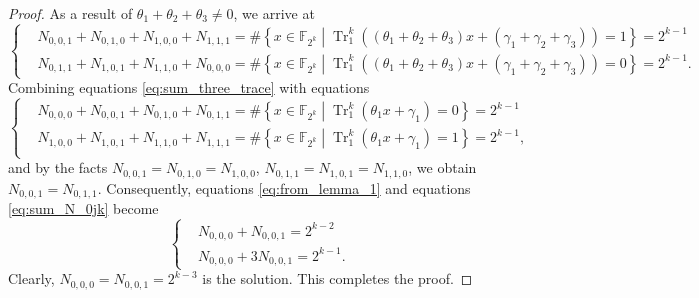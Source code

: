 \documentclass{article}
\newcommand{\F}{\mathbb{F}}
\newcommand{\0}{\textbf{0}}
\newcommand{\1}{\textbf{1}}
\newcommand{\TRACE}{\operatorname{Tr}_1^k}
\theoremstyle{plain}
\begin{document}
\begin{proof}
        As a result of $ \theta_1+\theta_2+\theta_3\ne 0 $, we arrive at  
        \begin{equation}\label{eq:sum_three_trace} \left\{\begin{alignedat}{2}
            &N_{0,0,1}+N_{0,1,0}+N_{1,0,0}+N_{1,1,1}=\#\left\{x\in\F_{2^k}\middle|\TRACE\left(\left(\theta_1+\theta_2+\theta_3\right)x+\left(\gamma_1+\gamma_2+\gamma_3\right)\right)=1\right\}=2^{k-1}\\
            &N_{0,1,1}+N_{1,0,1}+N_{1,1,0}+N_{0,0,0}=\#\left\{x\in\F_{2^k}\middle|\TRACE\left(\left(\theta_1+\theta_2+\theta_3\right)x+\left(\gamma_1+\gamma_2+\gamma_3\right)\right)=0\right\}=2^{k-1}.
        \end{alignedat}\right.\end{equation}
        Combining equations \eqref{eq:sum_three_trace} with  equations  
        \begin{equation}\label{eq:sum_N_0jk}\left\{\begin{alignedat}{2}
            &N_{0,0,0}+N_{0,0,1}+N_{0,1,0}+N_{0,1,1}=\#\left\{x\in\F_{2^k}\middle|\TRACE\left(\theta_1x+\gamma_1\right)=0\right\}=2^{k-1}\\
            &N_{1,0,0}+N_{1,0,1}+N_{1,1,0}+N_{1,1,1}=\#\left\{x\in\F_{2^k}\middle|\TRACE\left(\theta_1x+\gamma_1\right)=1\right\}=2^{k-1},\\
        \end{alignedat}\right.\end{equation}
        and by the facts $ N_{0,0,1}=N_{0,1,0}=N_{1,0,0} $, $ N_{0,1,1}=N_{1,0,1}=N_{1,1,0} $, we obtain $ N_{0,0,1}=N_{0,1,1} $. 
        Consequently, equations \eqref{eq:from_lemma_1} and equations \eqref{eq:sum_N_0jk} become  
        \begin{equation*}\left\{\begin{alignedat}{2}
            &N_{0,0,0}+N_{0,0,1}=2^{k-2}\\
            &N_{0,0,0}+3N_{0,0,1}=2^{k-1}.
        \end{alignedat}\right.\end{equation*}
        Clearly, $ N_{0,0,0}=N_{0,0,1}=2^{k-3} $ is the solution. This completes the proof.
    \end{proof}
\end{document}
